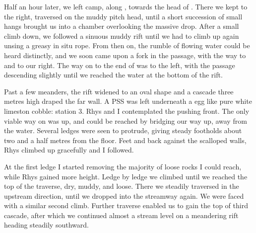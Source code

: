 Half an hour later, we left camp, along , towards the head of . There we kept to the right, traversed on the muddy pitch head, until a short succession of small hangs brought us into a chamber overlooking the massive drop. After a small climb down, we followed a sinuous muddy rift until we had to climb up again unsing a greasy in situ rope. From then on, the rumble of flowing water could be heard distinctly, and we soon came upon a fork in the passage, with the way to  and  to our right. The way on to the end of  was to the left, with the passage descending slightly until we reached the water at the bottom of the rift.



Past a few meanders, the rift widened to an oval shape and a cascade three metres high draped the far wall. A PSS was left underneath a egg like pure white limeston cobble:  station 3. Rhys and I contemplated the pushing front. The only viable way on was up, and could be reached by bridging our way up, away from the water. Several ledges were seen to protrude, giving steady footholds about two and a half metres from the floor. Feet and back against the scalloped walls, Rhys  climbed up gracefully and I followed.

At the first ledge I started removing the majority of loose rocks I could reach, while Rhys gained more height. Ledge by ledge we climbed until we reached the top of the traverse, dry, muddy, and loose. There we steadily traversed in the upstream direction, until we dropped into the streamway again. We were faced with a similar second climb. Further traverse enabled us to gain the top of third cascade, after which we continued almost a stream level on a meandering rift heading steadily southward.




